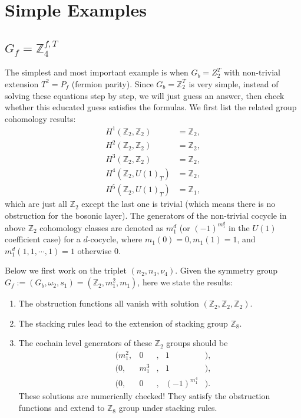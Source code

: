 \documentclass[%
 reprint,
 amsmath,amssymb,
 aps,
prb,
]{revtex4-2}
\begin{document}
\section{Simple Examples}

\subsection{$G_f = \mathbb Z_4^{f,T}$}

The simplest and most important example is when $G_b = Z_2^T$ with non-trivial extension $T^2 = P_f$ (fermion parity).
Since $G_b = \mathbb Z_2^T$ is very simple, instead of solving these equations step by step, we will just guess an answer, then check whether this educated guess satisfies the formulas.
We first list the related group cohomology results:
\begin{align}
H^1(\mathbb Z_2, \mathbb Z_2) &= \mathbb Z_2 ,\\
H^2(\mathbb Z_2, \mathbb Z_2) &= \mathbb Z_2 ,\\
H^3(\mathbb Z_2, \mathbb Z_2) &= \mathbb Z_2 ,\\
H^4(\mathbb Z_2, U(1)_T) &= \mathbb Z_2 , \\
H^5(\mathbb Z_2, U(1)_T) &= \mathbb Z_1 ,
\end{align}
which are just all $\mathbb Z_2$ except the last one is trivial (which means there is no obstruction for the bosonic layer).
The generators of the non-trivial cocycle in above $\mathbb Z_2$ cohomology classes are denoted as $m_1^d$ (or $(-1)^{m_1^d}$ in the $U(1)$ coefficient case) for a $d$-cocycle, where $m_1(0) = 0, m_1(1) = 1$, and $m_1^d(1,1,\cdots, 1) = 1$ otherwise $0$.

Below we first work on the triplet $(n_2, n_3, \nu_4)$.
Given the symmetry group $G_f := (G_b, \omega_2, s_1) = (\mathbb Z_2, m^2_1, m_1)$, here we state the results:
\begin{enumerate}
\item The obstruction functions all vanish with solution $(\mathbb Z_2, \mathbb Z_2, \mathbb Z_2)$.
\item The stacking rules lead to the extension of stacking group $\mathbb Z_8$.
\item The cochain level generators of these $\mathbb Z_2$ groups should be 
\begin{align}
&(m^2_1 ,& 0 &,& 1 &) ,\\
&(0 ,& m^3_1 &,& 1 &) ,\\
&(0 ,& 0 &,& (-1)^{m^4_1} &) .
\end{align}
These solutions are numerically checked!
They satisfy the obstruction functions and extend to $\mathbb Z_8$ group under stacking rules.
\end{enumerate}
\end{document}
